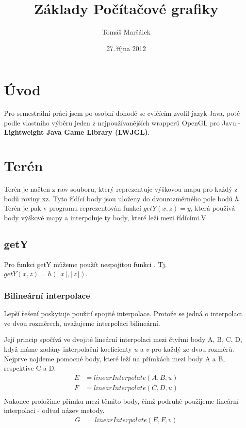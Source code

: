 \documentclass[11pt]{article}
\title{Základy Počítačové grafiky}
\author{Tomáš Maršálek}
\date{27.\,října 2012}
\begin{document}
\maketitle
\section{Úvod}
Pro semestrální práci jsem po osobní dohodě se cvičícím zvolil jazyk Java, poté
podle vlastního výběru jeden z nejpoužívanějších wrapperů OpenGL pro Javu -
\textbf {Lightweight Java Game Library (LWJGL)}.


\section{Terén}
Terén je načten z raw souboru, který reprezentuje výškovou mapu pro každý z
bodů roviny xz. Tyto řídící body jsou uloženy do dvourozměrného pole bodů $h$.
Terén je pak v programu reprezentován funkcí $getY(x, z) = y$, která používá
body výškové mapy a interpoluje ty body, které leží mezi řídícími.V

\subsection{getY}
Pro funkci getY můžeme použít nespojitou funkci . Tj. $getY(x, z) =
h (\lfloor x \rfloor, \lfloor z \rfloor)$.

\subsubsection{Bilineární interpolace}
Lepší řešení poskytuje použití spojité interpolace. Protože se jedná o
interpolaci ve dvou rozměrech, uvažujeme interpolaci bilineární.

Její princip spočívá ve dvojité lineární interpolaci mezi čtyřmi body A, B, C,
D, když máme zadány interpolační koeficienty $u$ a $v$ pro každý ze dvou
rozměrů. Nejprve najdeme pomocné body, které leží na přímkách mezi body A a B,
respektive C a D.
\begin{align*}
E &= linearInterpolate(A, B, u) \\
F &= linearInterpolate(C, D, u) \\
\end{align*}
Nakonec proložíme přímku mezi těmito body, čímž podruhé použijeme lineární interpolaci - odtud název metody.
\begin{align*}
G &= linearInterpolate(E, F, v) \\
\end{align*}
\end{document}

